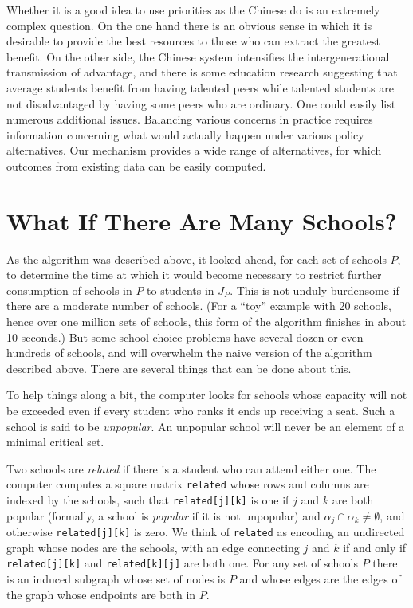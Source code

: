\documentclass[12pt]{article}
\theoremstyle{definition}
\begin{document}
Whether it is a good idea to use priorities as the Chinese do is an
extremely complex question.  On the one hand there is an obvious sense
in which it is desirable to provide the best resources to those who
can extract the greatest benefit.  On the other side, the Chinese
system intensifies the intergenerational transmission of advantage,
and there is some education research suggesting that average students
benefit from having talented peers while talented students are not
disadvantaged by having some peers who are ordinary. One could easily
list numerous additional issues.  Balancing various concerns in
practice requires information concerning what would actually happen
under various policy alternatives.  Our mechanism provides a wide
range of alternatives, for which outcomes from existing data can be
easily computed.

\section{What If There Are Many Schools?}

As the algorithm was described above, it looked ahead, for each set of
schools $P$, to determine the time at which it would become necessary
to restrict further consumption of schools in $P$ to students in
$J_P$.  This is not unduly burdensome if there are a moderate number
of schools.  (For a ``toy'' example with 20 schools, hence over one
million sets of schools, this form of the algorithm finishes in about
10 seconds.)  But some school choice problems have several dozen or
even hundreds of schools, and will overwhelm the naive version of the
algorithm described above.  There are several things that can be done
about this.

To help things along a bit, the computer looks for schools whose
capacity will not be exceeded even if every student who ranks it ends
up receiving a seat.  Such a school is said to be \emph{unpopular}.
An unpopular school will never be an element of a minimal critical set.

Two schools are \emph{related} if there is a student who can attend
either one.  The computer computes a square matrix \texttt{related}
whose rows and columns are indexed by the schools, such that
\texttt{related[j][k]} is one if $j$ and $k$ are both popular
(formally, a school is \emph{popular} if it is not unpopular) and
$\alpha_j \cap \alpha_k \ne \emptyset$, and otherwise
\texttt{related[j][k]} is zero.  We think of \texttt{related} as
encoding an undirected graph whose nodes are the schools, with an edge
connecting $j$ and $k$ if and only if \texttt{related[j][k]} and
\texttt{related[k][j]} are both one.  For any set of schools $P$ there
is an induced subgraph whose set of nodes is $P$ and whose edges are
the edges of the graph whose endpoints are both in $P$.
\end{document}
